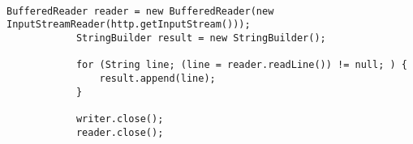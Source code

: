 \begin{lstlisting}[caption={Empfangen von Bestätigungen am Server},label=lst:ServerEmGCM]

BufferedReader reader = new BufferedReader(new InputStreamReader(http.getInputStream()));
			StringBuilder result = new StringBuilder();
			
			for (String line; (line = reader.readLine()) != null; ) {
				result.append(line);
			}

			writer.close();
			reader.close();

\end{lstlisting}
